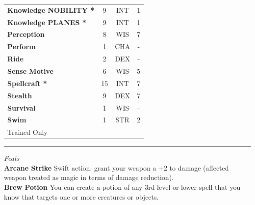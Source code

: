 \documentclass[letterpaper]{article}
\newcommand{\e}[1]{\emph{#1}}
\newcommand{\B}[1]{\textbf{#1}}
\begin{document}
\begin{table}[h!]
{{\begin{tabular}{l  c  c  c}
        \hline
        \B{Knowledge {\scriptsize NOBILITY} *} & 9 & {\footnotesize INT} & 1 \\
        \B{Knowledge {\scriptsize PLANES} *} & 9 & {\footnotesize INT} & 1 \\
        \hline
        \B{Perception} & 8 & {\footnotesize WIS} & 7 \\
        \B{Perform} & 1 & {\footnotesize CHA} & - \\
        \hline
        \B{Ride} & 2 & {\footnotesize DEX} & - \\
        \B{Sense Motive} & 6 & {\footnotesize WIS} & 5 \\
        \hline
        \B{Spellcraft *} & 15 & {\footnotesize INT} & 7 \\
        \B{Stealth} & 9 & {\footnotesize DEX} & 7 \\
        \hline
        \B{Survival} & 1 & {\footnotesize WIS} & - \\
        \B{Swim} & 1 & {\footnotesize STR} & 2 \\
        {\footnotesize * Trained Only} \\
        \end{tabular}
    }
}
\vspace{-1em}
\end{table}
\hrule
\vspace{0.5em}
\e{Feats}\\
\B{Arcane Strike} Swift action: grant your weapon a +2 to damage (affected weapon treated as magic in terms of damage reduction). \\
\B{Brew Potion} You can create a potion of any 3rd-level or lower spell that you know that targets one or more creatures or objects. \\
\end{document}

